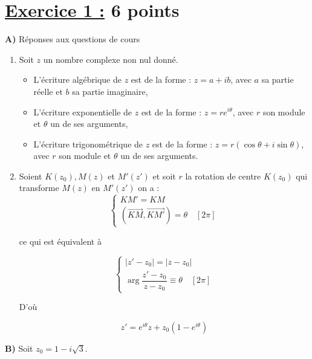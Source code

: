 \documentclass[12pt,a4paper]{article}
\begin{document}
\section*{\underline{Exercice 1 :} 6 points }
\textbf{A)} Réponses aux questions de cours
\begin{enumerate}
    \item Soit \( z \) un nombre complexe non nul donné.
          \begin{itemize}
              \item L’écriture algébrique de \( z \) est de la forme : \( z = a + ib \), avec \( a \) sa partie réelle et \( b \) sa partie imaginaire,
              \item L’écriture exponentielle de \( z \) est de la forme : \( z = r e^{i\theta} \), avec \( r \) son module et \( \theta \) un de ses arguments,
              \item L’écriture trigonométrique de \( z \) est de la forme : \( z = r(\cos\theta + i\sin\theta) \), avec \( r \) son module et \( \theta \) un de ses arguments.
          \end{itemize}
    \item Soient \( K(z_0), M(z) \) et \( M'(z') \) et soit \( r \) la rotation de centre \( K(z_0) \) qui transforme \( M(z) \) en \( M'(z') \) on a :
          \[
              \begin{cases}
                  KM' = KM \\
                  (\overrightarrow{KM}, \overrightarrow{KM'}) = \theta \quad [2\pi]
              \end{cases} \tag{1}
          \]

          ce qui est équivalent à

          \[
              \begin{cases}
                  |z' - z_0| = |z - z_0| \\
                  \arg \dfrac{z' - z_0}{z - z_0} \equiv \theta \quad [2\pi]
              \end{cases} \tag{2}
          \]

          D’où

          \[
              z' = e^{i\theta} z + z_0 (1 - e^{i\theta})
          \]

\end{enumerate}

\textbf{B)} Soit \( z_0 = 1 - i\sqrt{3} \).
\end{document}
